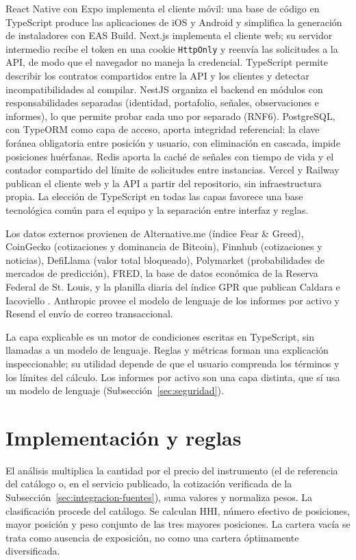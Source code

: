 React Native con Expo implementa el cliente móvil: una base de código en TypeScript produce las aplicaciones de iOS y Android y simplifica la generación de instaladores con EAS Build. Next.js implementa el cliente web; su servidor intermedio recibe el token en una cookie \texttt{HttpOnly} y reenvía las solicitudes a la API, de modo que el navegador no maneja la credencial. TypeScript permite describir los contratos compartidos entre la API y los clientes y detectar incompatibilidades al compilar. NestJS organiza el backend en módulos con responsabilidades separadas (identidad, portafolio, señales, observaciones e informes), lo que permite probar cada uno por separado (RNF6). PostgreSQL, con TypeORM como capa de acceso, aporta integridad referencial: la clave foránea obligatoria entre posición y usuario, con eliminación en cascada, impide posiciones huérfanas. Redis aporta la caché de señales con tiempo de vida y el contador compartido del límite de solicitudes entre instancias. Vercel y Railway publican el cliente web y la API a partir del repositorio, sin infraestructura propia. La elección de TypeScript en todas las capas favorece una base tecnológica común para el equipo y la separación entre interfaz y reglas.

Los datos externos provienen de Alternative.me (índice Fear \& Greed), CoinGecko (cotizaciones y dominancia de Bitcoin), Finnhub (cotizaciones y noticias), DefiLlama (valor total bloqueado), Polymarket (probabilidades de mercados de predicción), FRED, la base de datos económica de la Reserva Federal de St. Louis, y la planilla diaria del índice GPR que publican Caldara e Iacoviello \parencite{CaldaraIacoviello2022}. Anthropic provee el modelo de lenguaje de los informes por activo y Resend el envío de correo transaccional.

La capa explicable es un motor de condiciones escritas en TypeScript, sin llamadas a un modelo de lenguaje. Reglas y métricas forman una explicación inspeccionable; su utilidad depende de que el usuario comprenda los términos y los límites del cálculo. Los informes por activo son una capa distinta, que sí usa un modelo de lenguaje (Subsección~\ref{sec:seguridad}).

\section{Implementación y reglas}\label{sec:implementacion}

El análisis multiplica la cantidad por el precio del instrumento (el de referencia del catálogo o, en el servicio publicado, la cotización verificada de la Subsección~\ref{sec:integracion-fuentes}), suma valores y normaliza pesos. La clasificación procede del catálogo. Se calculan HHI, número efectivo de posiciones, mayor posición y peso conjunto de las tres mayores posiciones. La cartera vacía se trata como ausencia de exposición, no como una cartera óptimamente diversificada.

